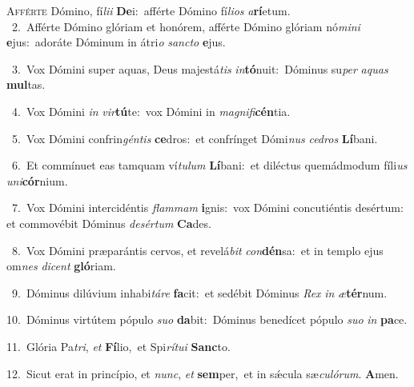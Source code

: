 \lettrine{\initial\textcolor{\initialcolor}{A}}{fférte} Dómino, fí\-\textit{li}\-\textit{i} \textbf{De}\-i:~\star afférte Dómino fí\-\textit{li}\-\textit{os} \textit{a}\-\textbf{rí}etum.\\
{\numbfont\textcolor{\numbcolor}{~2.}}~Afférte Dómino glóriam et honórem, afférte Dómino glóriam nó\-\textit{mi}\-\textit{ni} \textbf{e}\-jus:~\star adoráte Dóminum in átri\textit{o} \textit{sanc}\-\textit{to} \textbf{e}\-jus.\par
{\numbfont\textcolor{\numbcolor}{~3.}}~Vox Dómini super aquas, Deus majestá\textit{tis} \textit{in}\-\textbf{tó}nuit:~\star Dóminus su\textit{per} \textit{a}\-\textit{quas} \textbf{mul}\-tas.\par
{\numbfont\textcolor{\numbcolor}{~4.}}~Vox Dómini \textit{in} \textit{vir}\-\textbf{tú}te:~\star vox Dómini in \textit{ma}\-\textit{gni}\textit{fi}\textbf{cén}tia.\par
{\numbfont\textcolor{\numbcolor}{~5.}}~Vox Dómini confrin\-\textit{gén}\-\textit{tis} \textbf{ce}\-dros:~\star et confrínget Dómi\textit{nus} \textit{ce}\-\textit{dros} \textbf{Lí}\-bani.\par
{\numbfont\textcolor{\numbcolor}{~6.}}~Et commínuet eas tamquam ví\-\textit{tu}\-\textit{lum} \textbf{Lí}\-bani:~\star et diléctus quemádmodum fíli\textit{us} \textit{u}\-\textit{ni}\textbf{cór}nium.\par
{\numbfont\textcolor{\numbcolor}{~7.}}~Vox Dómini intercidéntis \textit{flam}\-\textit{mam} \textbf{i}\-gnis:~\star vox Dómini concutiéntis desértum: et commovébit Dóminus \textit{de}\-\textit{sér}\textit{tum} \textbf{Ca}\-des.\par
{\numbfont\textcolor{\numbcolor}{~8.}}~Vox Dómini præparántis cervos, et revelá\textit{bit} \textit{con}\-\textbf{dén}sa:~\star et in templo ejus om\textit{nes} \textit{di}\-\textit{cent} \textbf{gló}\-riam.\par
{\numbfont\textcolor{\numbcolor}{~9.}}~Dóminus dilúvium inhabi\-\textit{tá}\-\textit{re} \textbf{fa}\-cit:~\star et sedébit Dóminus \textit{Rex} \textit{in} \textit{æ}\-\textbf{tér}num.\par
{\numbfont\textcolor{\numbcolor}{10.}}~Dóminus virtútem pópulo \textit{su}\-\textit{o} \textbf{da}\-bit:~\star Dóminus benedícet pópulo \textit{su}\-\textit{o} \textit{in} \textbf{pa}\-ce.\par
{\numbfont\textcolor{\numbcolor}{11.}}~Glória Pa\-\textit{tri}\-, \textit{et} \textbf{Fí}\-lio,~\star et Spi\-\textit{rí}\-\textit{tu}\textit{i} \textbf{Sanc}\-to.\par
{\numbfont\textcolor{\numbcolor}{12.}}~Sicut erat in princípio, et \textit{nunc}\-, \textit{et} \textbf{sem}\-per,~\star et in sǽcula sæ\-\textit{cu}\-\textit{ló}\textit{rum}. \textbf{A}\-men.\par

